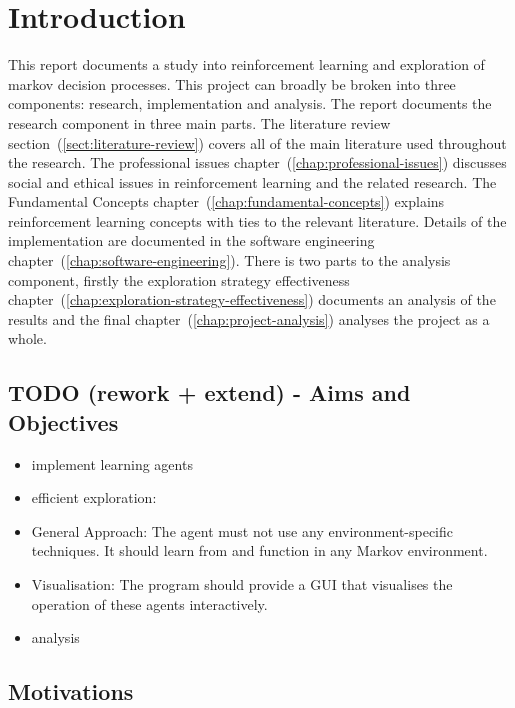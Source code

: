 \documentclass[]{final_report}
\begin{document}

\chapter{Introduction}

This report documents a study into reinforcement learning and exploration of markov decision processes. This project can broadly be broken into three components: research, implementation and analysis. The report documents the research component in three main parts. The literature review section~(\ref{sect:literature-review}) covers all of the main literature used throughout the research. The professional issues chapter~(\ref{chap:professional-issues}) discusses social and ethical issues in reinforcement learning and the related research. The Fundamental Concepts chapter~(\ref{chap:fundamental-concepts}) explains reinforcement learning concepts with ties to the relevant literature. Details of the implementation are documented in the software engineering chapter~(\ref{chap:software-engineering}). There is two parts to the analysis component, firstly the exploration strategy effectiveness chapter~(\ref{chap:exploration-strategy-effectiveness}) documents an analysis of the results and the final chapter~(\ref{chap:project-analysis}) analyses the project as a whole.



\section{TODO (rework + extend) - Aims and Objectives}
\begin{itemize}
  \item implement learning agents
  \item efficient exploration: 
  \item General Approach: The agent must not use any environment-specific techniques. It should learn from and function in any Markov environment.
  \item Visualisation: The program should provide a GUI that visualises the operation of these agents interactively.
  \item analysis 
\end{itemize}

\section{Motivations}
\end{document}
